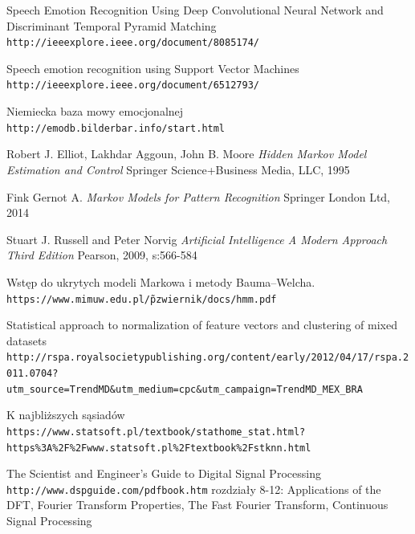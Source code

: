 \documentclass[declaration,shortabstract]{iithesis}
\begin{document}
\begin{thebibliography}{99}

Speech Emotion Recognition Using Deep Convolutional Neural Network and Discriminant Temporal Pyramid Matching
\\\texttt{http://ieeexplore.ieee.org/document/8085174/}

Speech emotion recognition using Support Vector Machines
\\\texttt{http://ieeexplore.ieee.org/document/6512793/}

Niemiecka baza mowy emocjonalnej
\\\texttt{http://emodb.bilderbar.info/start.html}

\bibitem{}
Robert J. Elliot, Lakhdar Aggoun, John B. Moore 
\textit{Hidden Markov Model Estimation and Control}
Springer Science+Business Media, LLC, 1995

\bibitem{}
Fink Gernot A.
\textit{Markov Models for Pattern Recognition}
Springer London Ltd, 2014

\bibitem{}
Stuart J. Russell and Peter Norvig
\textit{Artificial Intelligence A Modern Approach Third Edition}
Pearson, 2009, s:566-584

\bibitem{}
Wstęp do ukrytych modeli Markowa i metody Bauma–Welcha.
\\\texttt{https://www.mimuw.edu.pl/\~pzwiernik/docs/hmm.pdf}

\bibitem{}
Statistical approach to normalization of feature vectors and clustering of mixed datasets
\\\texttt{http://rspa.royalsocietypublishing.org/content/early/2012/04/17/rspa.2011.0704?utm\_source=TrendMD\&utm\_medium=cpc\&utm\_campaign=TrendMD\_MEX\_BRA}

\bibitem{}
K najbliższych sąsiadów
\\\texttt{https://www.statsoft.pl/textbook/stathome\_stat.html?https\%3A\%2F\%2Fwww.statsoft.pl\%2Ftextbook\%2Fstknn.html}

\bibitem{}
The Scientist and Engineer's Guide to Digital Signal Processing
\\\texttt{http://www.dspguide.com/pdfbook.htm}
rozdziały 8-12: Applications of the DFT, Fourier Transform Properties, The Fast Fourier Transform, Continuous Signal Processing

\end{thebibliography}
\end{document}
